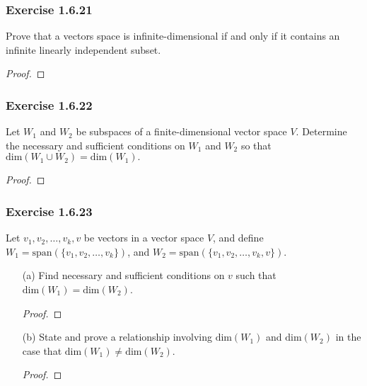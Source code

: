 \subsubsection{Exercise 1.6.21} Prove that a vectors space is infinite-dimensional if and only if it contains an infinite linearly independent subset. 
\begin{proof}
\end{proof}


\subsubsection{Exercise 1.6.22} Let \( W_{1} \) and \( W_{2} \) be subspaces of a finite-dimensional vector space \( V  \). Determine the necessary and sufficient conditions on \( W_{1}  \) and \( W_{2} \) so that \( \text{dim}(W_{1} \cup W_{2}) = \text{dim}(W_{1}). \)    
\begin{proof}

\end{proof}

\subsubsection{Exercise 1.6.23} Let \( v_{1}, v_{2}, \dots, v_{k }, v  \) be vectors in a vector space \( V  \), and define \( W_{1} = \text{span}(\{ v_{1}, v_{2}, \dots, v_{k } \} )  \), and \( W_{2} = \text{span}(\{ v_{1}, v_{2}, \dots, v_{k }, v  \} ) \).
\begin{enumerate}
    \item[(a)] Find necessary and sufficient conditions on \( v  \) such that \( \text{dim}(W_{1}) = \text{dim}(W_{2}) \).
        \begin{proof}
        
        \end{proof}
    \item[(b)] State and prove a relationship involving \( \text{dim}(W_{1}) \) and \( \text{dim}(W_{2}) \) in the case that \( \text{dim}(W_{1}) \neq \text{dim}(W_{2})  \).
        \begin{proof}
        
        \end{proof}
\end{enumerate}
